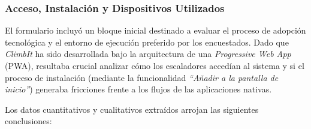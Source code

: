\subsubsection{Acceso, Instalación y Dispositivos Utilizados}

El formulario incluyó un bloque inicial destinado a evaluar el proceso de adopción tecnológica y el entorno de ejecución preferido por los encuestados. Dado que \textit{ClimbIt} ha sido desarrollada bajo la arquitectura de una \textit{Progressive Web App} (PWA), resultaba crucial analizar cómo los escaladores accedían al sistema y si el proceso de instalación (mediante la funcionalidad \textit{``Añadir a la pantalla de inicio''}) generaba fricciones frente a los flujos de las aplicaciones nativas.

Los datos cuantitativos y cualitativos extraídos arrojan las siguientes conclusiones:


